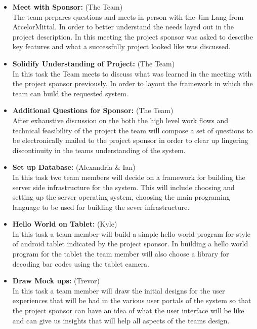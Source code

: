 \documentclass[Letter,11pt]{article}
\begin{document}
		\begin{itemize}
			\item\textbf{Meet with Sponsor:} (The Team)\\
			The team prepares questions and meets in person with the Jim Lang from ArcelorMittal. In order to better understand the needs layed out in the project description. In this meeting the project sponsor was asked to describe key features and  what a successfully project looked like was discussed.
			
			\item \textbf{Solidify Understanding of Project:} (The Team)\\
			In this task the Team meets to discuss what was learned in the meeting with the project sponsor previously. In order to layout the framework in which the team can build the requested system.
			
			\item\textbf{Additional Questions for Sponsor:} (The Team)\\
			After exhaustive discussion on the both the high level work flows and technical feasibility of the project the team will compose a set of questions to be electronically mailed to the project sponsor in order to clear up lingering discontinuity in the teams understanding of the system.
			
			\item\textbf{Set up Database:} (Alexandria \& Ian)\\
			In this task two team members will decide on a framework for building the server side infrastructure for the system. This will include choosing and setting up the server operating system, choosing the main programing language to be used for building the sever infrastructure.
			
			\item\textbf{Hello World on Tablet:} (Kyle)\\
			In this task a team member will build a simple hello world program for style of android tablet indicated by the project sponsor. In building a hello world program for the tablet the team member will also choose a library for decoding bar codes using the tablet camera. 
			
			\item\textbf{Draw Mock ups:} (Trevor)\\
			In this task a team member will draw the initial designs for the user experiences that will be had in the various user portals of the system so that the project sponsor can have an idea of what the user interface will be like and can give us insights that will help all aspects of the teams design. 
			

\end{itemize}
\end{document}
